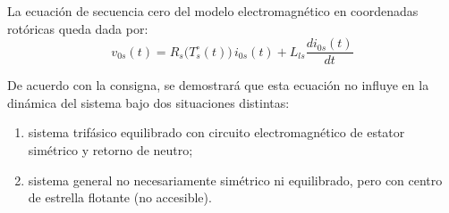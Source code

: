\documentclass[12pt, a4paper,journal, onecolumn, compsoc]{IEEEtran}
\begin{document}
    La ecuación de secuencia cero del modelo electromagnético en coordenadas rotóricas queda dada por:
    \begin{equation}
        v_{0s}(t)=R_s\!\big(T_s^\circ(t)\big)\,i_{0s}(t)+L_{ls}\frac{d i_{0s}(t)}{dt}
        \label{eq:v0s_rotor_final}
    \end{equation}

    De acuerdo con la consigna, se demostrará que esta ecuación no influye en la dinámica del sistema bajo dos situaciones distintas:

    \begin{enumerate}
        \item sistema trifásico equilibrado con circuito electromagnético de estator simétrico y retorno de neutro;
        \item sistema general no necesariamente simétrico ni equilibrado, pero con centro de estrella flotante (no accesible).
    \end{enumerate}
\end{document}
